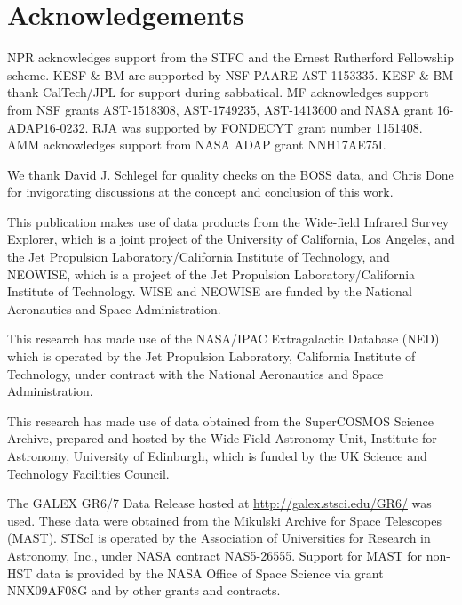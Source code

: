 \documentclass[a4paper,fleqn,usenatbib]{mnras}
\begin{document}
\smallskip
\smallskip


\section*{Acknowledgements}
NPR acknowledges support from the STFC and the Ernest Rutherford
Fellowship scheme.  KESF \& BM are supported by NSF PAARE
AST-1153335. KESF \& BM thank CalTech/JPL for support during
sabbatical.  MF acknowledges support from NSF grants AST-1518308,
AST-1749235, AST-1413600 and NASA grant 16-ADAP16-0232.  RJA was
supported by FONDECYT grant number 1151408. AMM acknowledges
support from NASA ADAP grant NNH17AE75I.

We thank David J. Schlegel for quality checks on the BOSS data, and
Chris Done for invigorating discussions at the concept and conclusion
of this work.

This publication makes use of data products from the Wide-field
Infrared Survey Explorer, which is a joint project of the University
of California, Los Angeles, and the Jet Propulsion
Laboratory/California Institute of Technology, and NEOWISE, which is a
project of the Jet Propulsion Laboratory/California Institute of
Technology. WISE and NEOWISE are funded by the National Aeronautics
and Space Administration.

This research has made use of the NASA/IPAC Extragalactic Database
(NED) which is operated by the Jet Propulsion Laboratory, California
Institute of Technology, under contract with the National Aeronautics
and Space Administration.

This research has made use of data obtained from the SuperCOSMOS
Science Archive, prepared and hosted by the Wide Field Astronomy Unit,
Institute for Astronomy, University of Edinburgh, which is funded by
the UK Science and Technology Facilities Council.

The GALEX GR6/7 Data Release hosted at
\href{http://galex.stsci.edu/GR6/}{http://galex.stsci.edu/GR6/} was
used. These data were obtained from the Mikulski Archive for Space
Telescopes (MAST). STScI is operated by the Association of
Universities for Research in Astronomy, Inc., under NASA contract
NAS5-26555. Support for MAST for non-HST data is provided by the NASA
Office of Space Science via grant NNX09AF08G and by other grants and
contracts.
\end{document}
